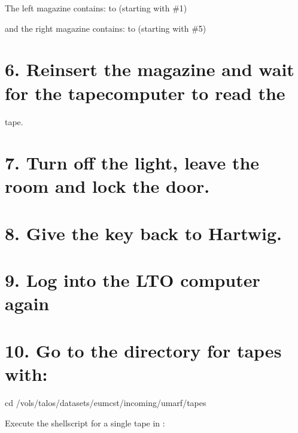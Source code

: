 \documentclass[letterpaper,10pt,english]{sphinxmanual}
\begin{document}

 The left magazine contains:   to  (starting with \#1)

and the right magazine contains:   to  (starting with \#5)


\section{6. Re\sphinxhyphen{}insert the magazine and wait for the tape\sphinxhyphen{}computer to read the}
\label{\detokenize{extract_tapes:re-insert-the-magazine-and-wait-for-the-tape-computer-to-read-the}}
tape.


\section{7. Turn off the light, leave the room and lock the door.}
\label{\detokenize{extract_tapes:turn-off-the-light-leave-the-room-and-lock-the-door}}

\section{8. Give the key back to Hartwig.}
\label{\detokenize{extract_tapes:give-the-key-back-to-hartwig}}

\section{9. Log into the LTO computer again}
\label{\detokenize{extract_tapes:log-into-the-lto-computer-again}}


\section{10. Go to the directory for tapes with:}
\label{\detokenize{extract_tapes:go-to-the-directory-for-tapes-with}}
\begin{sphinxVerbatim}[commandchars=\\\{\}]
cd /vols/talos/datasets/eumcst/incoming/umarf/tapes
\end{sphinxVerbatim}

Execute the shell\sphinxhyphen{}script  for a single tape in :
\end{document}
